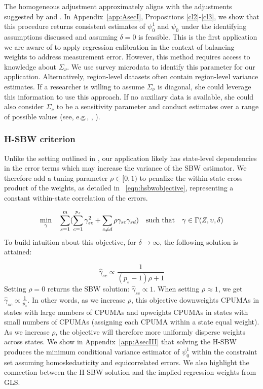 \documentclass[aoas]{imsart}
\theoremstyle{plain}
\theoremstyle{remark}
\begin{document}
The homogeneous adjustment approximately aligns with the adjustments suggested by \cite{carroll2006measurement} and \cite{gleser1992importance}. In Appendix~\ref{app:AsecI}, Propositions \ref{cl2}-\ref{cl3}, we show that this procedure returns consistent estimates of $\psi_0^1$ and $\psi_0$ under the identifying assumptions discussed and assuming $\delta = 0$ is feasible. This is the first application we are aware of to apply regression calibration in the context of balancing weights to address measurement error. However, this method requires access to knowledge about $\Sigma_{\nu}$. We use survey microdata to identify this parameter for our application. Alternatively, region-level datasets often contain region-level variance estimates. If a researcher is willing to assume $\Sigma_{\nu}$ is diagonal, she could leverage this information to use this approach. If no auxiliary data is available, she could also consider $\Sigma_{\nu}$ to be a sensitivity parameter and conduct estimates over a range of possible values (see, e.g., \cite{huque2014impact}, \cite{illenberger2020impact}). 

\subsubsection{H-SBW criterion}\label{sssec:hsbw}

Unlike the setting outlined in \cite{zubizarreta2015stable}, our application likely has state-level dependencies in the error terms which may increase the variance of the SBW estimator. We therefore add a tuning parameter $\rho \in [0, 1)$ to penalize the within-state cross product of the weights, as detailed in ~\eqref{eqn:hsbwobjective}, representing a constant within-state correlation of the errors.

\begin{equation}\label{eqn:hsbwobjective}
\min_{\gamma} \quad \sum_{s=1}^{m}(\sum_{c = 1}^{p_s}\gamma_{sc}^2 + \sum_{c \ne d}\rho \gamma_{sc}\gamma_{sd}) \quad \text{such that} \quad \gamma \in \Gamma(Z, \upsilon, \delta)\\
\end{equation}
To build intuition about this objective, for $\delta \to \infty$, the following solution is attained:

\begin{equation}\label{eqn:sbwsol}
\hat{\gamma}_{sc} \propto \frac{1}{(p_s - 1)\rho + 1}
\end{equation}
Setting $\rho = 0$ returns the SBW solution: $\hat{\gamma}_{sc} \propto 1$. When setting $\rho \approx 1$, we get $\hat{\gamma}_{sc} \propto \frac{1}{p_s}$. In other words, as we increase $\rho$, this objective downweights CPUMAs in states with large numbers of CPUMAs and upweights CPUMAs in states with small numbers of CPUMAs (assigning each CPUMA within a state equal weight). As we increase $\rho$, the objective will therefore more uniformly disperse weights across states. We show in Appendix~\ref{app:AsecIII} that solving the H-SBW produces the minimum conditional variance estimator of $\psi_0^1$ within the constraint set assuming homoskedasticity and equicorrelated errors. We also highlight the connection between the H-SBW solution and the implied regression weights from GLS.
\end{document}
